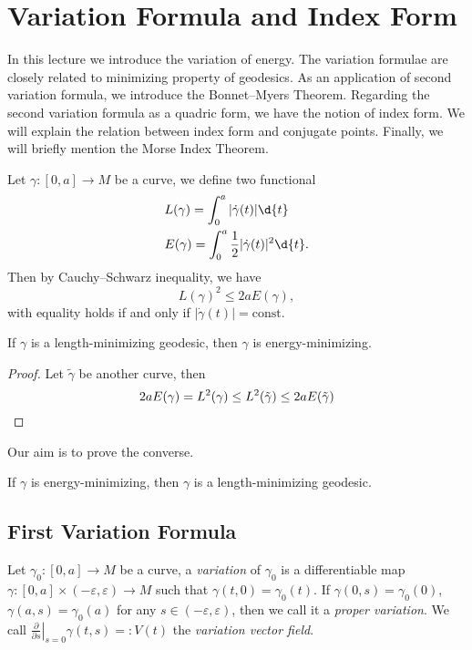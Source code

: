 \chapter{Variation Formula and Index Form}
In this lecture we introduce the variation of energy.
The variation formulae are closely related to minimizing property of geodesics.
As an application of second variation formula, we introduce the Bonnet--Myers Theorem.
Regarding the second variation formula as a quadric form, we have the notion of index form.
We will explain the relation between index form and conjugate points.
Finally, we will briefly mention the Morse Index Theorem.

Let $\gamma:[0,a]\to M$ be a curve, we define two functional
\begin{align*}
    &L(\gamma)=\int_0^a|\dot{\gamma}(t)|\d{t}\\
    &E(\gamma)=\int_0^a\frac{1}{2}|\dot{\gamma}(t)|^2\d{t}.
\end{align*}
Then by Cauchy--Schwarz inequality, we have
\[L(\gamma)^2\leq 2aE(\gamma),\]
with equality holds if and only if $|\dot{\gamma}(t)|=\text{const}$.
\begin{prop}\label{length-min implies energy-min}
    If $\gamma$ is a length-minimizing geodesic, then $\gamma$ is energy-minimizing.
\end{prop}
\begin{proof}
    Let $\tilde{\gamma}$ be another curve, then
    \[2aE(\gamma)=L^2(\gamma)\leq L^2(\tilde{\gamma})\leq 2aE(\tilde{\gamma})\qedhere\]
\end{proof}

Our aim is to prove the converse.
\begin{prop}\label{energy-min implies length-min}
    If $\gamma$ is energy-minimizing, then $\gamma$ is a length-minimizing geodesic.
\end{prop}

\section{First Variation Formula}

\begin{defn}[Variation]
    Let $\gamma_0:[0,a]\to M$ be a curve, a \emph{variation} of $\gamma_0$ is a differentiable map $\gamma:[0,a]\times(-\varepsilon,\varepsilon)\to M$ such that $\gamma(t,0)=\gamma_0(t)$.
    If $\gamma(0,s)=\gamma_0(0)$, $\gamma(a,s)=\gamma_0(a)$ for any $s\in(-\varepsilon,\varepsilon)$, then we call it a \emph{proper variation}.
    We call $\left.\frac{\partial{}}{\partial{s}}\right|_{s=0}\gamma(t,s)=:V(t)$ the \emph{variation vector field}.
\end{defn}

